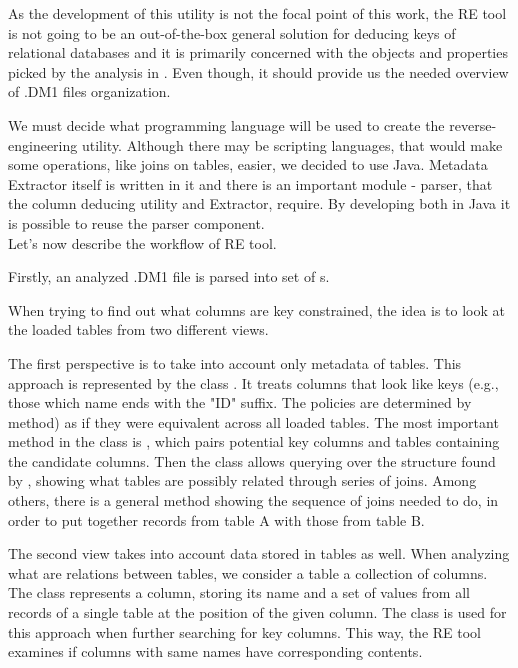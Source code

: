 As the development of this utility is not the focal point of this work, the RE tool is not going to be an out-of-the-box general solution for deducing keys of relational databases and it is primarily concerned with the objects and properties picked by the analysis in . Even though, it should provide us the needed overview of .DM1 files organization.

We must decide what programming language will be used to create the reverse-engineering utility. Although there may be scripting languages, that would make some operations, like joins on tables, easier, we decided to use Java. Metadata Extractor itself is written in it and there is an important module - parser, that the column deducing utility and Extractor, require. By developing both in Java it is possible to reuse the parser component. \\

Let's now describe the workflow of RE tool.

Firstly, an analyzed .DM1 file is parsed into set of s.

When trying to find out what columns are key constrained, the idea is to look at the loaded tables from two different views.

The first perspective is to take into account only metadata of tables. 
This approach is represented by the class . 
It treats columns that look like keys (e.g., those which name ends with the "ID" suffix. The policies are determined by  method) as if they were equivalent across all loaded tables.
The most important method in the class is , which pairs potential key columns and tables containing the candidate columns.
Then the class  allows querying over the structure found by , showing what tables are possibly related through series of joins.
Among others, there is a general method  showing the sequence of joins needed to do, in order to put together records from table A with those from table B.

The second view takes into account data stored in tables as well. 
When analyzing what are relations between tables, we consider a table a collection of columns. The   class represents a column, storing its name and a set of values from all records of a single table at the position of the given column.
The  class is used for this approach when further searching for key columns.
This way, the RE tool examines if columns with same names have corresponding contents.

